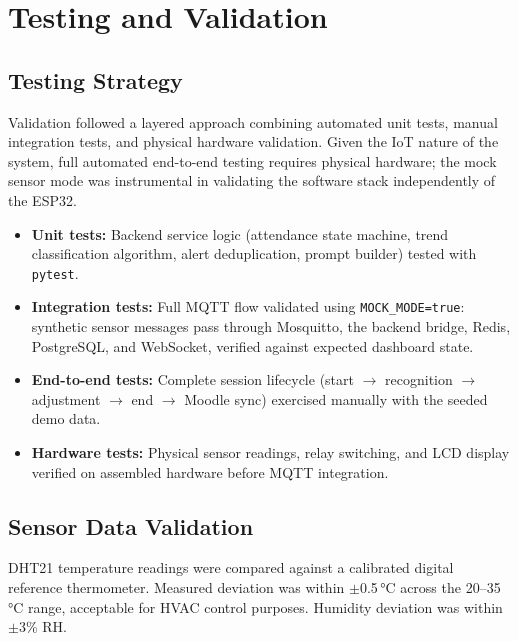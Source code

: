 \section{Testing and Validation}
\label{sec:testing}

\subsection{Testing Strategy}
\label{subsec:test_strategy}

Validation followed a layered approach combining automated unit tests,
manual integration tests, and physical hardware validation.  Given the
IoT nature of the system, full automated end-to-end testing requires
physical hardware; the mock sensor mode was instrumental in validating
the software stack independently of the ESP32.

\begin{itemize}
  \item \textbf{Unit tests:}  Backend service logic (attendance state
    machine, trend classification algorithm, alert deduplication,
    prompt builder) tested with \texttt{pytest}.
  \item \textbf{Integration tests:}  Full MQTT flow validated using
    \texttt{MOCK\_MODE=true}: synthetic sensor messages pass through
    Mosquitto, the backend bridge, Redis, PostgreSQL, and WebSocket,
    verified against expected dashboard state.
  \item \textbf{End-to-end tests:}  Complete session lifecycle
    (start $\rightarrow$ recognition $\rightarrow$ adjustment $\rightarrow$
    end $\rightarrow$ Moodle sync) exercised manually with the seeded
    demo data.
  \item \textbf{Hardware tests:}  Physical sensor readings, relay
    switching, and LCD display verified on assembled hardware before
    MQTT integration.
\end{itemize}

\subsection{Sensor Data Validation}
\label{subsec:sensor_validation}

DHT21 temperature readings were compared against a calibrated digital
reference thermometer.  Measured deviation was within $\pm$0.5\,°C
across the 20--35\,°C range, acceptable for HVAC control purposes.
Humidity deviation was within $\pm$3\% RH.

